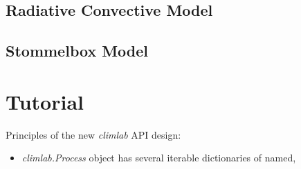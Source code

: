 \documentclass[letterpaper,10pt,english]{sphinxmanual}
\begin{document}
\section{Radiative Convective Model}
\label{models:radiative-convective-model}

\section{Stommelbox Model}
\label{models:stommelbox-model}

\chapter{Tutorial}
\label{tutorial::doc}\label{tutorial:tutorial}
Principles of the new \emph{climlab} API design:
\begin{itemize}
\item {} 
\emph{climlab.Process} object has several iterable dictionaries of named,

\end{itemize}
\end{document}
